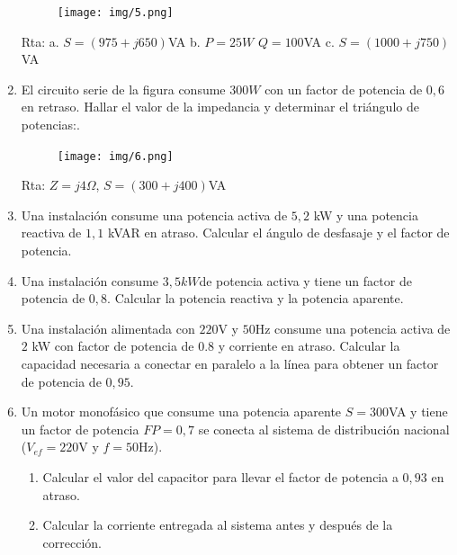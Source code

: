 \documentclass[10pt,a4paper]{article}
\begin{document}
\begin{enumerate}
\begin{figure}[H]
	\centering
	\texttt{[image: img/5.png]}
	\label{e6}
\end{figure}
  
Rta: a. $S=(975+j650)$VA b. $P=25W$ $Q=100$VA c. $S=(1000+j750)$VA
\item El circuito serie de la figura consume $300 W$ con un factor de potencia de $0,6$ en retraso. Hallar el valor de la impedancia y determinar el triángulo de potencias:.
\begin{figure}[H]
	\centering
	\texttt{[image: img/6.png]}
	\label{e7}
\end{figure}

Rta: $Z=j4\Omega$, $S=(300+j400)$VA
\item Una instalación consume una potencia activa de $5,2$ kW y una potencia reactiva de $1,1$ kVAR en atraso. Calcular el ángulo de desfasaje y el factor de potencia.
\item Una instalación consume $3,5kW $de potencia activa y tiene un factor de potencia de $0,8$. Calcular la potencia reactiva y la potencia aparente.



\item Una instalación alimentada con $220$V  y $50$Hz consume una potencia activa de $2$ kW con factor de potencia de $0.8$ y corriente en atraso. Calcular la capacidad necesaria a conectar en paralelo a la línea para obtener un factor de potencia de $0,95$.


\item Un motor monofásico que consume una potencia aparente $S=300$VA y tiene un factor de potencia $FP= 0,7$ se conecta al sistema de distribución nacional ($V_{ef}=220$V y $f=50$Hz).
\begin{enumerate}
	\item Calcular el valor del capacitor para llevar el factor de potencia a $0,93$ en atraso.
	\item Calcular la corriente entregada al sistema antes y después de la corrección. 
\end{enumerate}





\end{enumerate}
\end{document}
